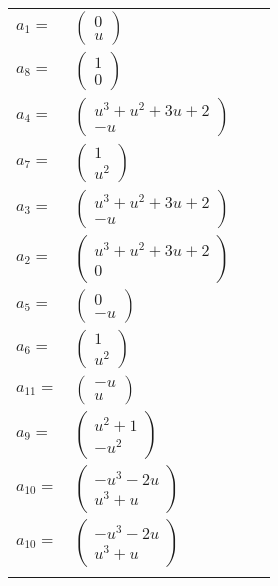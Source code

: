 \documentclass[1p]{elsarticle_modified}
\theoremstyle{definition}
\begin{document}
\begin{tabular}{m{7pt} m{180pt} m{7pt} m{180pt} }
\flushright $a_{1}=$&$\begin{pmatrix}0\\u\end{pmatrix}$ \\
\flushright $a_{8}=$&$\begin{pmatrix}1\\0\end{pmatrix}$ \\
\flushright $a_{4}=$&$\begin{pmatrix}u^3+u^2+3 u+2\\- u\end{pmatrix}$ \\
\flushright $a_{7}=$&$\begin{pmatrix}1\\u^2\end{pmatrix}$ \\
\flushright $a_{3}=$&$\begin{pmatrix}u^3+u^2+3 u+2\\- u\end{pmatrix}$ \\
\flushright $a_{2}=$&$\begin{pmatrix}u^3+u^2+3 u+2\\0\end{pmatrix}$ \\
\flushright $a_{5}=$&$\begin{pmatrix}0\\- u\end{pmatrix}$ \\
\flushright $a_{6}=$&$\begin{pmatrix}1\\u^2\end{pmatrix}$ \\
\flushright $a_{11}=$&$\begin{pmatrix}- u\\u\end{pmatrix}$ \\
\flushright $a_{9}=$&$\begin{pmatrix}u^2+1\\- u^2\end{pmatrix}$ \\
\flushright $a_{10}=$&$\begin{pmatrix}- u^3-2 u\\u^3+u\end{pmatrix}$\\ \flushright $a_{10}=$&$\begin{pmatrix}- u^3-2 u\\u^3+u\end{pmatrix}$\\&\end{tabular}
\end{document}
